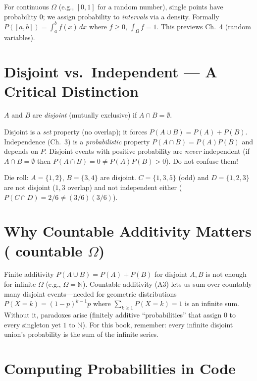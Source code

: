 For continuous $\Omega$ (e.g., $[0,1]$ for a random number), single points have probability $0$; we assign probability to \emph{intervals} via a density. Formally $P([a,b])=\int_a^b f(x)\,dx$ where $f\ge0$, $\int_{\Omega}f=1$. This previews Ch.~4 (random variables).

\section{Disjoint vs.\ Independent --- A Critical Distinction}
\label{sec:disjoint-independent}

\begin{definition}[Disjoint] $A$ and $B$ are \emph{disjoint} (mutually exclusive) if $A\cap B=\emptyset$.
\end{definition}

Disjoint is a \emph{set} property (no overlap); it forces $P(A\cup B)=P(A)+P(B)$. Independence (Ch.~3) is a \emph{probabilistic} property $P(A\cap B)=P(A)P(B)$ and depends on $P$. Disjoint events with positive probability are \emph{never} independent (if $A\cap B=\emptyset$ then $P(A\cap B)=0\ne P(A)P(B)>0$). Do not confuse them!

\begin{example} Die roll: $A=\{1,2\}$, $B=\{3,4\}$ are disjoint. $C=\{1,3,5\}$ (odd) and $D=\{1,2,3\}$ are not disjoint ($1,3$ overlap) and not independent either ($P(C\cap D)=2/6\ne(3/6)(3/6)$).
\end{example}

\section{Why Countable Additivity Matters ( countable $\Omega$)}
\label{sec:countable}
Finite additivity $P(A\cup B)=P(A)+P(B)$ for disjoint $A,B$ is not enough for infinite $\Omega$ (e.g., $\Omega=\mathbb{N}$). Countable additivity (A3) lets us sum over countably many disjoint events---needed for geometric distributions $P(X=k)=(1-p)^{k-1}p$ where $\sum_{k\ge1}P(X=k)=1$ is an infinite sum. Without it, paradoxes arise (finitely additive ``probabilities'' that assign $0$ to every singleton yet $1$ to $\mathbb{N}$). For this book, remember: every infinite disjoint union's probability is the sum of the infinite series.

\section{Computing Probabilities in Code}
\label{sec:code-prob}

